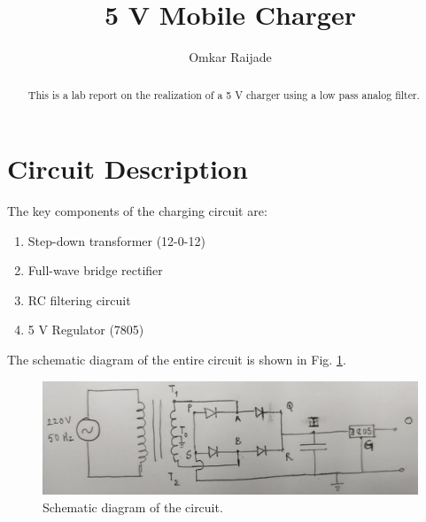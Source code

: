 \documentclass[journal,12pt,twocolumn]{IEEEtran}
\begin{document}
	\let\StandardTheFigure\thefigure
	\renewcommand{\thefigure}{\arabic{section}.\arabic{figure}}
	\makeatletter
	\makeatother
	
	
	\def\putbox#1#2#3{\makebox[0in][l]{\makebox[#1][l]{}\raisebox{\baselineskip}[0in][0in]{\raisebox{#2}[0in][0in]{#3}}}}
	\def\rightbox#1{\makebox[0in][r]{#1}}
	\def\centbox#1{\makebox[0in]{#1}}
	\def\topbox#1{\raisebox{-\baselineskip}[0in][0in]{#1}}
	\def\midbox#1{\raisebox{-0.5\baselineskip}[0in][0in]{#1}}
	
	\vspace{3cm}
	
	\title{5 V Mobile Charger}
	\author{Omkar Raijade}
	\maketitle
	\tableofcontents
	\renewcommand{\thetable}{\theenumi}
	\bigskip
	\begin{abstract}
		This is a lab report on the realization of a 5 V charger using
		a low pass analog filter.
	\end{abstract}
	\section{Circuit Description}
	The key components of the charging circuit are:
	\begin{enumerate}
		\item Step-down transformer (12-0-12)
		\item Full-wave bridge rectifier
		\item RC filtering circuit
		\item 5 V Regulator (7805)
	\end{enumerate}
	
	The schematic diagram of the entire circuit is shown in Fig. \ref{fig:ckt}.
	\begin{figure}[!htb]
		\includegraphics[width=\columnwidth]{ckt.jpg}
		\caption{Schematic diagram of the circuit.}
		\label{fig:ckt}
	\end{figure}
\end{document}
